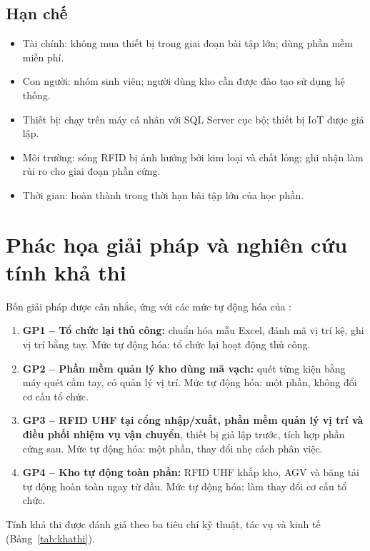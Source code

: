 \subsection{Hạn chế}
\begin{itemize}
  \item Tài chính: không mua thiết bị trong giai đoạn bài tập lớn; dùng phần mềm miễn phí.
  \item Con người: nhóm sinh viên; người dùng kho cần được đào tạo sử dụng hệ thống.
  \item Thiết bị: chạy trên máy cá nhân với SQL Server cục bộ; thiết bị IoT được giả lập.
  \item Môi trường: sóng RFID bị ảnh hưởng bởi kim loại và chất lỏng; ghi nhận làm rủi ro cho giai đoạn phần cứng.
  \item Thời gian: hoàn thành trong thời hạn bài tập lớn của học phần.
\end{itemize}

\section{Phác họa giải pháp và nghiên cứu tính khả thi}
\label{sec:giaiphap}

Bốn giải pháp được cân nhắc, ứng với các mức tự động hóa của \cite[Ch.~4]{tung_qlhttt}:
\begin{enumerate}
  \item \textbf{GP1 -- Tổ chức lại thủ công:} chuẩn hóa mẫu Excel, đánh mã vị trí kệ, ghi vị trí bằng tay. Mức tự động hóa: tổ chức lại hoạt động thủ công.
  \item \textbf{GP2 -- Phần mềm quản lý kho dùng mã vạch:} quét từng kiện bằng máy quét cầm tay, có quản lý vị trí. Mức tự động hóa: một phần, không đổi cơ cấu tổ chức.
  \item \textbf{GP3 -- RFID UHF \cite{epcgen2} tại cổng nhập/xuất, phần mềm quản lý vị trí và điều phối nhiệm vụ vận chuyển}, thiết bị giả lập trước, tích hợp phần cứng sau. Mức tự động hóa: một phần, thay đổi nhẹ cách phân việc.
  \item \textbf{GP4 -- Kho tự động toàn phần:} RFID UHF khắp kho, AGV và băng tải tự động hoàn toàn ngay từ đầu. Mức tự động hóa: làm thay đổi cơ cấu tổ chức.
\end{enumerate}

Tính khả thi được đánh giá theo ba tiêu chí kỹ thuật, tác vụ và kinh tế (Bảng~\ref{tab:khathi}).

